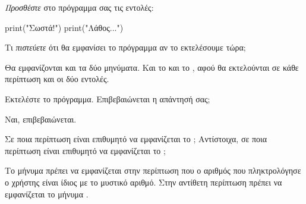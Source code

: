 \documentclass[a4paper,11pt,oneside]{book}
\begin{document}
\begin{step}

\emph{Προσθέστε} στο πρόγραμμα σας τις εντολές: %

\begin{pynew}
print("Σωστά!")
print("Λάθος...")
\end{pynew}

Τι \emph{πιστεύετε} ότι θα εμφανίσει το πρόγραμμα αν το εκτελέσουμε τώρα;

\begin{answer}
Θα εμφανίζονται και τα δύο μηνύματα. Και το  και το , αφού θα εκτελούνται σε κάθε περίπτωση και οι δύο εντολές.
\end{answer}

Εκτελέστε το πρόγραμμα. Επιβεβαιώνεται η απάντησή σας;

\begin{answer}
	Ναι, επιβεβαιώνεται.
\end{answer}

Σε ποια περίπτωση είναι επιθυμητό να εμφανίζεται το ; Αντίστοιχα, σε ποια περίπτωση είναι επιθυμητό να εμφανίζεται το ;

\begin{answer}
	Το μήνυμα  πρέπει να εμφανίζεται στην περίπτωση που ο αριθμός που πληκτρολόγησε ο χρήστης είναι ίδιος με το μυστικό αριθμό. Στην αντίθετη περίπτωση πρέπει να εμφανίζεται το μήνυμα .
\end{answer}
\end{step}
\end{document}
